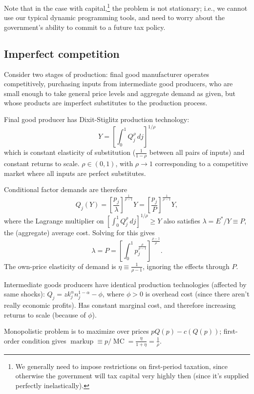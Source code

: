 \documentclass[8pt,letterpaper, landscape]{extarticle} %
\begin{document}
\begin{multicols}{3}
\begin{description}
Note that in the case with capital,\footnote{We generally need to impose restrictions on first-period taxation, since otherwise the government will tax capital very highly then (since it's supplied perfectly inelastically).} the problem is not stationary; i.e., we cannot use our typical dynamic programming tools, and need to worry about the government's ability to commit to a future tax policy.

\subsection{Imperfect competition}
 Consider two stages of production: final good manufacturer operates competitively, purchasing inputs from intermediate good producers, who are small enough to take general price levels and aggregate demand as given, but whose products are imperfect substitutes to the production process.

 Final good producer has Dixit-Stiglitz production technology:
$$ Y = \left[ \int_0^1 Q_j^{\rho} \, dj \right]^{1 / \rho} $$
which is constant elasticity of substitution ($ \frac{1}{1 - \rho} $ between all pairs of inputs) and constant returns to scale. $ \rho \in (0,1) $, with $ \rho \to 1 $ corresponding to a competitive market where all inputs are perfect substitutes.

Conditional factor demands are therefore
$$ Q_j (Y) = \left[ \frac{p_j}{\lambda} \right]^{\frac{1}{\rho - 1}} Y = \left[ \frac{p_j}{P} \right]^{\frac{1}{\rho - 1}} Y, $$
where the Lagrange multiplier on $ [ \int_0^1 Q_j^{\rho} \, dj ]^{1 / \rho} \geq Y $ also satisfies $ \lambda = E^* / Y \equiv P $, the (aggregate) average cost. Solving for this gives
$$ \lambda = P = \left[ \int_0^1 p_j^{\frac{\rho}{\rho - 1}}  \right]^{\frac{\rho - 1}{\rho}}. $$
The own-price elasticity of demand is $ \eta \equiv \frac{1}{\rho - 1} $, ignoring the effects through $ P $.

 Intermediate goods producers have identical production technologies (affected by same shocks): $ Q_j = z k_j^{\alpha} n_j^{1 - \alpha} - \phi $, where $ \phi > 0 $ is overhead cost (since there aren't really economic profits). Has constant marginal cost, and therefore increasing returns to scale (because of $ \phi $).

Monopolistic problem is to maximize over prices $ p Q(p) - c(Q(p)) $; first-order condition gives $ \operatorname{markup} \equiv p / \operatorname{MC} = \frac{\eta}{1 + \eta} = \frac{1}{\rho} $.


\end{description}
\end{multicols}
\end{document}

